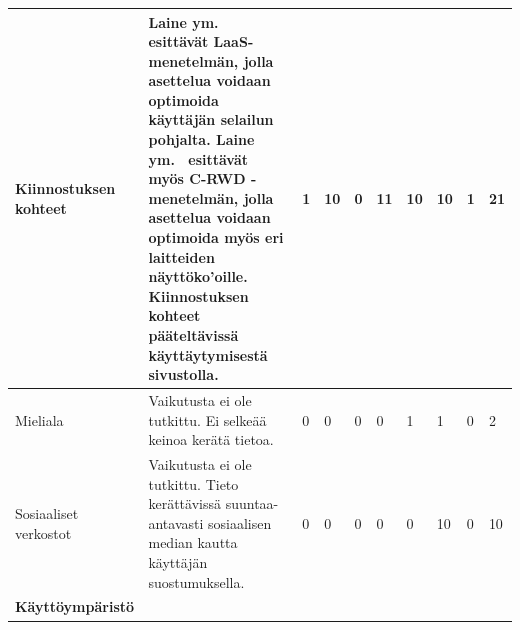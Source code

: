 \documentclass[finnish, 12pt, a4paper, elec, utf8, a-1b, online]{aaltothesis}
\begin{document}
{\begin{longtable}{p{2.5cm}|p{6cm}|p{0.5cm}p{0.5cm}p{0.5cm}|p{0.5cm}|p{0.5cm}p{0.5cm}p{0.5cm}|p{0.5cm}|}
    \midrule
    Kiinnostuksen kohteet                  & Laine ym.~\cite{laine2020_laas} esittävät LaaS-menetelmän, jolla asettelua voidaan optimoida käyttäjän selailun pohjalta. Laine ym.~\cite{laine2021responsive} esittävät myös C-RWD -menetelmän, jolla asettelua voidaan optimoida myös eri laitteiden näyttöko'oille. Kiinnostuksen kohteet pääteltävissä käyttäytymisestä sivustolla. & 1                                          & 10                                  & 0                                      & 11                           & 10                                              & 10                                        & 1                                         & 21                           \\
    \midrule
    Mieliala                               & Vaikutusta ei ole tutkittu. Ei selkeää keinoa kerätä tietoa.                                                                                                                                                                                                                                                                            & 0                                          & 0                                   & 0                                      & 0                            & 1                                               & 1                                         & 0                                         & 2                            \\
    \midrule
    Sosiaaliset verkostot                  & Vaikutusta ei ole tutkittu. Tieto kerättävissä suuntaa-antavasti sosiaalisen median kautta käyttäjän suostumuksella.                                                                                                                                                                                                                    & 0                                          & 0                                   & 0                                      & 0                            & 0                                               & 10                                        & 0                                         & 10                           \\
    \midrule
    \textbf{Käyttöympäristö}                                                                                                                                                                                                                                                                                                                                                                                                                                                                                                                                                                                                                                                                                             \\

\end{longtable}}
\end{document}
